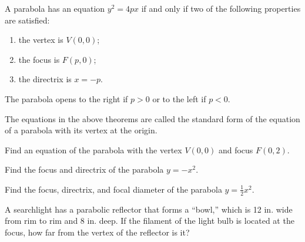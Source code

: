 
  \begin{theorem}
  A parabola has an equation $y^2=4px$ if and only if two of the following properties are satisfied:
  \begin{enumerate}
      \item the vertex is $V(0, 0)$;
      \item the focus is $F(p, 0)$;
      \item the directrix is $x=-p$.
  \end{enumerate}
  
  The parabola opens to the right if $p>0$ or to the left if $p<0$.
  \end{theorem}

\begin{definition}
  The equations in the above theorems are called the standard form of the equation of a parabola with its vertex at the origin.
\end{definition}

\begin{example}
    Find an equation of the parabola with the vertex $V(0,0)$ and focus $F(0,2)$.
\end{example}

\newpage

\begin{example}
Find the focus and directrix of the parabola $y=-x^2$.
\end{example}

\begin{example}
    Find the focus, directrix, and focal diameter of the parabola $y=\frac{1}{2}x^2$.
\end{example}


\begin{example}
A searchlight has a parabolic reflector that forms a “bowl,” which is 12 in. wide from rim to rim and 8 in. deep.  If the filament of the light bulb is located at the focus, how far from the vertex of the reflector is it?
\end{example}


